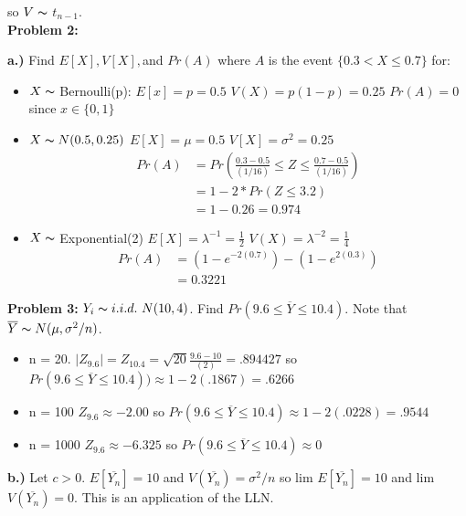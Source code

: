 \documentclass[11pt]{article}
\begin{document}
so $V \thicksim$ $t_{n-1}$.\\


\textbf{Problem 2:} 

\textbf{a.)} Find $E[X], V[X], $and $Pr(A)$ where $A$ is the event $\{0.3 < X \leq 0.7\}$ for:
\begin{itemize}
    \item $X \thicksim$ Bernoulli(p):
    $E[x] = p = 0.5$
    $V(X) = p(1-p) = 0.25$
    $Pr(A) = 0$ since $ x \in \{0, 1\}$
    
    \item $X \thicksim N(0.5, 0.25)$
    $E[X] = \mu = 0.5$
    $V[X] = \sigma^{2} = 0.25$\\
    \begin{align*}
        Pr(A) &= Pr(\frac{0.3 - 0.5}{(1/16)} \leq Z \leq \frac{0.7 - 0.5}{(1/16)})\\
        &= 1 - 2 * Pr(Z \leq 3.2)\\
        &= 1 - 0.26 = 0.974
    \end{align*}
    
    \item $X \thicksim$ Exponential(2)
    $E[X] = \lambda^{-1} = \frac{1}{2}$
    $V(X) = \lambda^{-2} = \frac{1}{4}$
    \begin{align*}
        Pr(A) &= (1 - e^{-2(0.7)}) - (1 - e^{2(0.3)})\\
        &= 0.3221
    \end{align*}
\end{itemize}

\textbf{Problem 3:} $Y_{i} \thicksim i.i.d.\ N(10, 4)$.  Find $Pr(9.6 \leq \overline{Y} \leq 10.4)$.
Note that $\overline{Y} \thicksim N(\mu, \sigma^{2}/n)$.
\begin{itemize}
    \item n = 20.
    $|Z_{9.6}| = Z_{10.4} = \sqrt{20}\frac{9.6 - 10}{(2)} = .894427$
    so $Pr(9.6 \leq \overline{Y} \leq 10.4)) \approx 1 - 2(.1867) = .6266$
    
    \item n = 100
    $Z_{9.6} \approx -2.00$ so $Pr(9.6 \leq \overline{Y} \leq 10.4) \approx 1 - 2(.0228) = .9544$
    
    \item n = 1000
    $Z_{9.6} \approx -6.325$ so $Pr(9.6 \leq \overline{Y} \leq 10.4) \approx 0$\\

\end{itemize}
    
\textbf{b.)} Let $c > 0$.  $E[\overline{Y_{n}}] = 10$ and $V(\overline{Y_{n}}) = \sigma^{2}/n$ so lim $E[\overline{Y_{n}}] = 10$ and lim $V(\overline{Y_{n}}) = 0$.  This is an application of the LLN.
\end{document}
